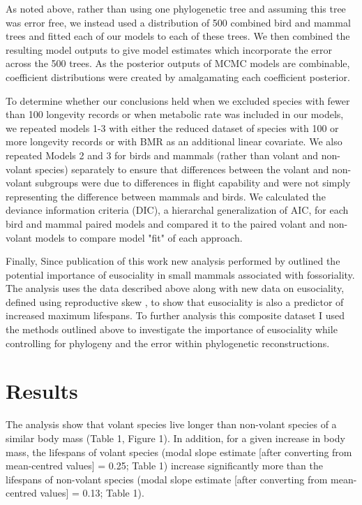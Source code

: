 As noted above, rather than using one phylogenetic tree and assuming this tree was error free, we instead used a distribution of 500 combined bird and mammal trees and fitted each of our models to each of these trees. We then combined the resulting model outputs to give model estimates which incorporate the error across the 500 trees.  As the posterior outputs of MCMC models are combinable, coefficient distributions were created by amalgamating each coefficient posterior. 

To determine whether our conclusions held when we excluded species with fewer than 100 longevity records or when metabolic rate was included in our models, we repeated models 1-3 with either the reduced dataset of species with 100 or more longevity records or with BMR as an additional linear covariate. We also repeated Models 2 and 3 for birds and mammals (rather than volant and non-volant species) separately to ensure that differences between the volant and non-volant subgroups were due to differences in flight capability and were not simply representing the difference between mammals and birds. We calculated the deviance information criteria (DIC), a hierarchal generalization of AIC, for each bird and mammal paired models and compared it to the paired volant and non-volant models to compare model "fit" of each approach.

Finally, Since publication of this work \citep{healy2014ecology} new analysis performed by \cite{williams2015ecology} outlined the potential importance of eusociality in small mammals associated with fossoriality. The analysis uses the data described above along with new data on eusociality, defined using reproductive skew \citep{williams2015ecology}, to show that eusociality is also a predictor of increased maximum lifespans. To further analysis this composite dataset I used the methods outlined above to investigate the importance of eusociality while controlling for phylogeny and the error within phylogenetic reconstructions.

\section{Results}

The analysis show that volant species live longer than non-volant species of a similar body mass (Table 1, Figure 1). In addition, for a given increase in body mass, the lifespans of volant species (modal slope estimate [after converting from mean-centred values] = 0.25; Table 1) increase significantly more than the lifespans of non-volant species (modal slope estimate [after converting from mean-centred values] = 0.13; Table 1).


